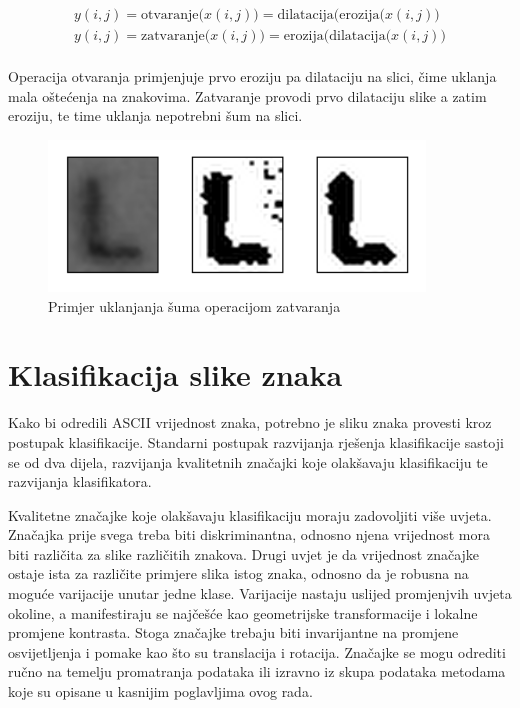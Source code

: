\documentclass[lmodern, utf8, diplomski, numeric]{fer}
\begin{document}
\begin{equation}
\begin{gathered}
y(i,j) = \text{otvaranje(} x(i,j) \text{)} = \text{dilatacija(erozija(} x(i,j) \text{)}\\
y(i,j) = \text{zatvaranje(} x(i,j) \text{)} = \text{erozija(dilatacija(} x(i,j) \text{)}\\
\end{gathered}
\end{equation}

\hspace{2em}

Operacija otvaranja primjenjuje prvo eroziju pa dilataciju na slici, čime uklanja mala oštećenja na znakovima. Zatvaranje provodi prvo dilataciju slike a zatim eroziju, te time uklanja nepotrebni šum na slici. 



\begin{figure}[ht!]
\centering
\includegraphics[width=10cm]{slike/closing_example.png}
\caption{Primjer uklanjanja šuma operacijom zatvaranja}
\end{figure}


\section{Klasifikacija slike znaka}

Kako bi odredili ASCII vrijednost znaka, potrebno je sliku znaka provesti kroz postupak klasifikacije. Standarni postupak razvijanja rješenja klasifikacije sastoji se od dva dijela, razvijanja kvalitetnih značajki koje olakšavaju klasifikaciju te razvijanja klasifikatora. 

Kvalitetne značajke koje olakšavaju klasifikaciju moraju zadovoljiti više uvjeta. Značajka prije svega treba biti diskriminantna, odnosno njena vrijednost mora biti različita za slike različitih znakova. Drugi uvjet je da vrijednost značajke ostaje ista za različite primjere slika istog znaka, odnosno da je robusna na moguće varijacije unutar jedne klase. Varijacije nastaju uslijed promjenjvih uvjeta okoline, a manifestiraju se najčešće kao geometrijske transformacije i lokalne promjene kontrasta. Stoga značajke trebaju biti invarijantne na promjene osvijetljenja i pomake kao što su translacija i rotacija. Značajke se mogu odrediti ručno na temelju promatranja podataka ili izravno iz skupa podataka metodama koje su opisane u kasnijim poglavljima ovog rada.
\end{document}
